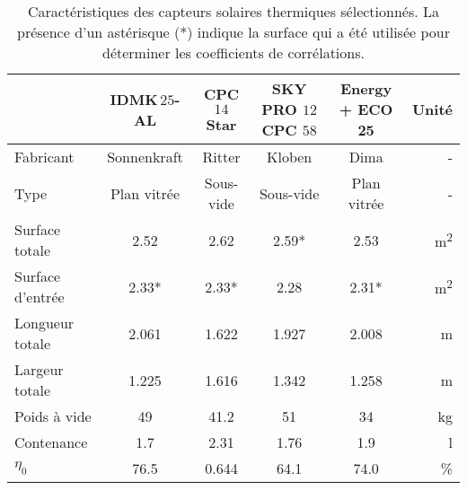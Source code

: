 \begin{table}
\centering
\caption[Caractéristiques des capteurs solaires thermiques sélectionnés]
        {Caractéristiques des capteurs solaires thermiques sélectionnés. La présence d’un astérisque (*)
         indique la surface qui a été utilisée pour déterminer les coefficients de corrélations.}
\label{tab:capteurs_specs_optimisation}
\begin{tabular}{l c c c c r}
    \toprule
                                 & IDMK\,$25$-AL              & CPC $14$ Star            & SKY PRO $12$ CPC $58$      & Energy + ECO 25         & Unité                       \\
    \midrule
    Fabricant                    & Sonnenkraft                & Ritter                   & Kloben                     & Dima                    & -                           \\
    Type                         & Plan vitrée                & Sous-vide                & Sous-vide                  & Plan vitrée             & -                           \\
    \addlinespace[\defaultaddspace]
    Surface totale               & \num{2.52}                 & \num{2.62}               & \num{2.59}*                & \num{2.53}              & \si{\metre\squared}                  \\
    Surface d’entrée             & \num{2.33}*                & \num{2.33}*              & \num{2.28}                 & \num{2.31}*              & \si{\metre\squared}                  \\
    Longueur totale              & \num{2.061}                & \num{1.622}              & \num{1.927}                & \num{2.008}             & \si{\metre}                  \\
    Largeur totale               & \num{1.225}                & \num{1.616}              & \num{1.342}                & \num{1.258}             & \si{\metre}                  \\
    Poids à vide                 & \num{49}                   & \num{41.2}               & \num{51}                   & \num{34}                & \si{kg}                     \\
    Contenance                   & \num{1.7}                  & \num{2.31}               & \num{1.76}                 & \num{1.9}               & \si{\litre}                 \\
    \addlinespace[\defaultaddspace]
    $\eta_{0}$                   & \num{76.5}                 & \num{0.644}              & \num{64.1}                 & \num{74.0}              & \si{\percent}                     \\

\end{tabular}
\end{table}
